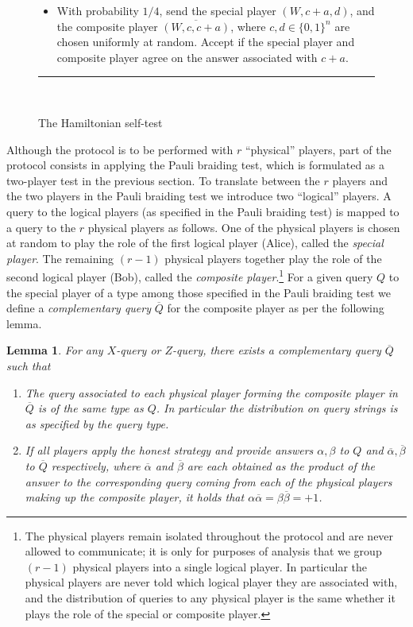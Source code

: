 \documentclass[11pt,letterpaper]{article}
\newcommand{\<}{\langle}
\renewcommand{\>}{\rangle}
\newtheorem{lemma}[theorem]{Lemma}
\begin{document}
\begin{figure}[H]
\begin{enumerate}
\begin{itemize}
\item With probability $1/4$, send the special player $(W, c+a,d)$, and the composite player $\overline{(W, c, c + a)}$, where $c, d \in \{0, 1\}^n$ are chosen uniformly at random. Accept if the special player and composite player agree on the answer associated with $c+a$.
\end{itemize}
\end{enumerate}
\rule[1ex]{16.5cm}{0.5pt}\\
\caption{The Hamiltonian self-test}
\label{fig:protocol}
\end{figure}

Although the protocol is to be performed with $r$ ``physical''
players, part of the protocol consists in applying the Pauli braiding test, which is formulated as a two-player test in the previous section. To translate between the $r$ players and the two players in the Pauli braiding test we introduce two ``logical'' players. A query to the logical players (as specified in the Pauli braiding test) is mapped to a query to the $r$ physical players as follows. One of the physical players is chosen at random to play the role of the first logical player (Alice), called the
\emph{special player}. The remaining $(r-1)$ physical players together play the role of the second logical player (Bob), called the \emph{composite player}.\footnote{The physical players remain isolated throughout the protocol and are never allowed to communicate; it is only for purposes of analysis that we group $(r-1)$ physical players into a single logical player. In particular the physical players are never told which logical player they are associated with, and the distribution of queries to any physical player is the same whether it plays the role of the special or composite player.} For a given query $Q$ to the special player of a type among those specified in the Pauli braiding test we define a \emph{complementary query} $\overline{Q}$ for the composite player as per the following lemma.     

\begin{lemma}
  For any $X$-query or $Z$-query, there exists a complementary query $\overline{Q}$ such that
  \begin{enumerate}
  \item The query associated to each physical player forming the composite player in $\overline{Q}$ is of the same type as $Q$. In particular the distribution on query strings is as specified by the query type. 
  \item If all players apply the honest strategy and provide answers $\alpha,\beta$ to $Q$ and  $\overline{\alpha},\overline{\beta}$ to $\overline{Q}$ respectively, where $\overline{\alpha}$ and $\overline{\beta}$ are each obtained as the product of the answer to the corresponding query coming from each of the physical players making up the composite player, it holds that $\alpha\overline{\alpha} = \beta\overline{\beta}=+1$.
  \end{enumerate}
  \label{lem:qbar}
\end{lemma}
\end{document}
